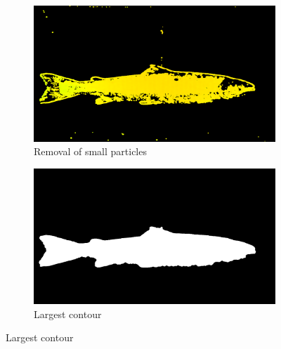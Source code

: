 \begin{figure}[H]
    \medskip
    \begin{subfigure}{0.48\textwidth}
        \includegraphics[width=\linewidth]{images/implementation/3_remove_particles}
        \caption{Removal of small particles} 
        \label{fig:remove_particles}
    \end{subfigure}\hspace*{\fill}
    \begin{subfigure}{0.48\textwidth}
        \includegraphics[width=\linewidth]{images/implementation/4_largest_contour}
        \caption{Largest contour} 
        \label{fig:largest_contour}
    \end{subfigure}
    

\end{figure}
